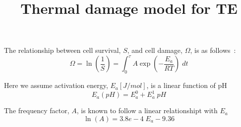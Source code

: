 \documentclass{article}         %
\title{Thermal damage model for TE}
\author{}
\theoremstyle{definition}
\theoremstyle{remark}
\begin{document}
                

The relationship between cell survival, $S$, and cell
damage, $\Omega$, is as follows~\cite{he2003quantification}:
\[
\Omega = \ln \left(\frac{1}{S}\right)
       = \int_0^\tau  A \exp\left( -\frac{E_a}{R T} \right)\; dt
\]

Here we assume activation energy, $E_a [J/mol]$, is a linear function of pH
\[
   E_a(pH) = E_a^0 + E_a^1  \; pH
\]

The frequency factor, $A$, is known to follow a linear relationshipt with $E_a$
\[
  \ln (A) = 3.8e-4 \; E_a  - 9.36
\]
\end{document}
